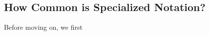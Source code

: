 \subsection{How Common is Specialized Notation?}
\label{s:motivation}
Before moving on, we first 

%
%
%
%
%
%  
